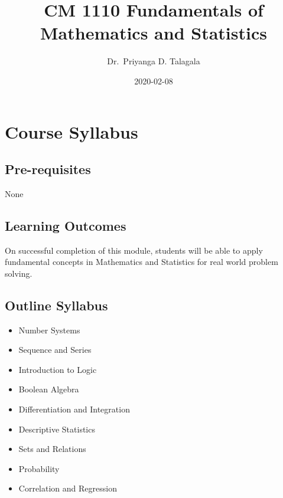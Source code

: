 \documentclass[]{book}
\title{CM 1110 Fundamentals of Mathematics and Statistics}
\author{Dr.~Priyanga D. Talagala}
\date{2020-02-08}
\providecommand{\tightlist}{%
  \setlength{\itemsep}{0pt}\setlength{\parskip}{0pt}}
\begin{document}
\maketitle

{
\setcounter{tocdepth}{1}
\tableofcontents
}
\hypertarget{course-syllabus}{%
\chapter*{Course Syllabus}\label{course-syllabus}}

\hypertarget{pre-requisites}{%
\section*{Pre-requisites}\label{pre-requisites}}

None

\hypertarget{learning-outcomes}{%
\section*{Learning Outcomes}\label{learning-outcomes}}

On successful completion of this module, students will be able to apply fundamental concepts in Mathematics and Statistics for real world problem solving.

\hypertarget{outline-syllabus}{%
\section*{Outline Syllabus}\label{outline-syllabus}}

\begin{itemize}
\tightlist
\item
  Number Systems
\item
  Sequence and Series
\item
  Introduction to Logic
\item
  Boolean Algebra
\item
  Differentiation and Integration
\item
  Descriptive Statistics
\item
  Sets and Relations
\item
  Probability
\item
  Correlation and Regression
\end{itemize}
\end{document}
